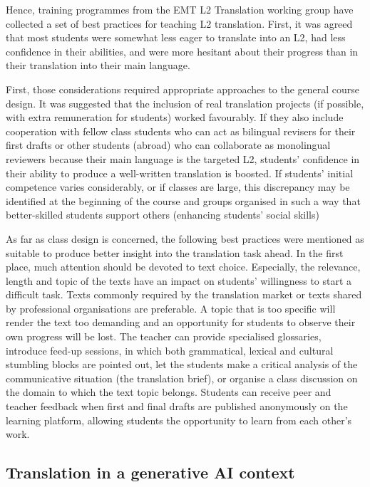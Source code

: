 \documentclass[output=paper]{langscibook}
\begin{document}
Hence, training programmes from the EMT L2 Translation working group \citep{vandepitte2023} have collected a set of best practices for teaching L2 translation. First, it was agreed that most students were somewhat less eager to translate into an L2, had less confidence in their abilities, and were more hesitant about their progress than in their translation into their main language. 

First, those considerations required appropriate approaches to the general course design. It was suggested that the inclusion of real translation projects (if possible, with extra remuneration for students) worked favourably. If they also include cooperation with fellow class students who can act as bilingual revisers for their first drafts or other students (abroad) who can collaborate as monolingual reviewers because their main language is the targeted L2, students’ confidence in their ability to produce a well-written translation is boosted. If students’ initial competence varies considerably, or if classes are large, this discrepancy may be identified at the beginning of the course and groups organised in such a way that better-skilled students support others (enhancing students’ social skills)

As far as class design is concerned, the following best practices were mentioned as suitable to produce better insight into the translation task ahead. In the first place, much attention should be devoted to text choice. Especially, the relevance, length and topic of the texts have an impact on students’ willingness to start a difficult task. Texts commonly required by the translation market or texts shared by professional organisations are preferable. A topic that is too specific will render the text too demanding and an opportunity for students to observe their own progress will be lost. The teacher can provide specialised glossaries, introduce feed-up sessions, in which both grammatical, lexical and cultural stumbling blocks are pointed out, let the students make a critical analysis of the communicative situation (the translation brief), or organise a class discussion on the domain to which the text topic belongs. Students can receive peer and teacher feedback when first and final drafts are published anonymously on the learning platform, allowing students the opportunity to learn from each other’s work. 

\subsection{Translation in a generative AI context}
\end{document}
